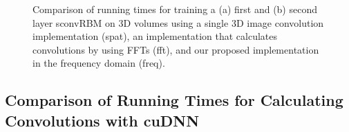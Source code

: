 \begin{figure}[t!]

\caption[Comparison of running times for training a sconvRBMs on 3D
images]{Comparison of running times for training a (a) first and (b) second
layer sconvRBM on 3D volumes using a single 3D image convolution implementation
(spat), an implementation that calculates convolutions by using FFTs (fft), and
our proposed implementation in the frequency domain (freq).}
\label{fig:run_oasis}
\end{figure}

\subsection[Comparison of running times for calculating convolutions with
cuDNN]{Comparison of Running Times for Calculating Convolutions with cuDNN}


